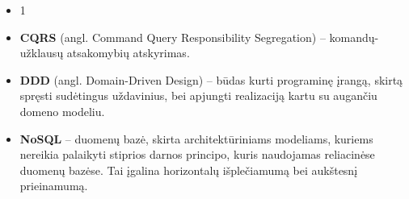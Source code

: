 \begin{itemize}

	\item 1

	\item \textbf{CQRS} (angl. Command Query Responsibility Segregation) – komandų-užklausų atsakomybių atskyrimas.

	\item \textbf{DDD} (angl. Domain-Driven Design) – būdas kurti programinę įrangą, skirtą spręsti sudėtingus uždavinius, bei apjungti realizaciją kartu su augančiu domeno modeliu.

	\item \textbf{NoSQL} – duomenų bazė, skirta architektūriniams modeliams, kuriems nereikia palaikyti stiprios darnos principo, kuris naudojamas reliacinėse duomenų bazėse. Tai įgalina horizontalų išplečiamumą bei aukštesnį prieinamumą.

\end{itemize}